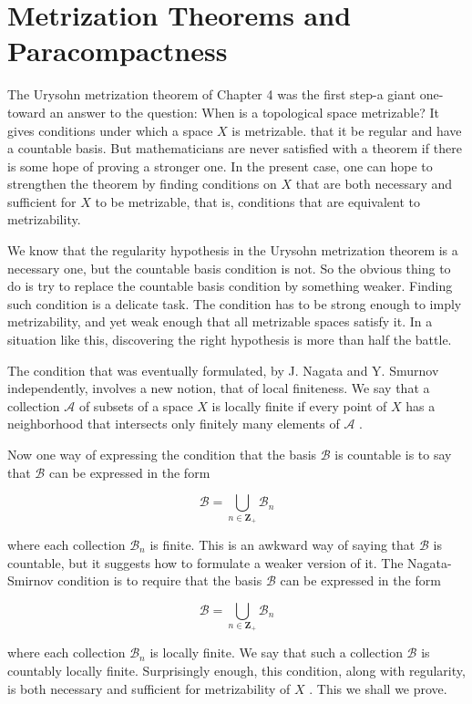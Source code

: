 \chapter{Metrization Theorems and Paracompactness}

The Urysohn metrization theorem of Chapter 4 was the first step-a giant one-toward an answer to the question: When is a topological space metrizable? It gives conditions under which a space \(X\) is metrizable. that it be regular and have a countable basis. But mathematicians are never satisfied with a theorem if there is some hope of proving a stronger one. In the present case, one can hope to strengthen the theorem by finding conditions on \(X\) that are both necessary and sufficient for \(X\) to be metrizable, that is, conditions that are equivalent to metrizability.

We know that the regularity hypothesis in the Urysohn metrization theorem is a necessary one, but the countable basis condition is not. So the obvious thing to do is try to replace the countable basis condition by something weaker. Finding such condition is a delicate task. The condition has to be strong enough to imply metrizability, and yet weak enough that all metrizable spaces satisfy it. In a situation like this, discovering the right hypothesis is more than half the battle.

The condition that was eventually formulated, by J. Nagata and Y. Smurnov independently, involves a new notion, that of local finiteness. We say that a collection \(\mathcal{A}\) of subsets of a space \(X\) is locally finite if every point of \(X\) has a neighborhood that intersects only finitely many elements of \(\mathcal{A}\) .

Now one way of expressing the condition that the basis \(\mathcal{B}\) is countable is to say that \(\mathcal{B}\) can be expressed in the form

\[
\mathcal{B} = \mathop{\bigcup }\limits_{{n \in  {\mathbf{Z}}_{ + }}}{\mathcal{B}}_{n}
\]

where each collection \({\mathcal{B}}_{n}\) is finite. This is an awkward way of saying that \(\mathcal{B}\) is countable, but it suggests how to formulate a weaker version of it. The Nagata-Smirnov condition is to require that the basis \(\mathcal{B}\) can be expressed in the form

\[
\mathcal{B} = \mathop{\bigcup }\limits_{{n \in  {\mathbf{Z}}_{ + }}}{\mathcal{B}}_{n}
\]

where each collection \({\mathcal{B}}_{n}\) is locally finite. We say that such a collection \(\mathcal{B}\) is countably locally finite. Surprisingly enough, this condition, along with regularity, is both necessary and sufficient for metrizability of \(X\) . This we shall we prove.

